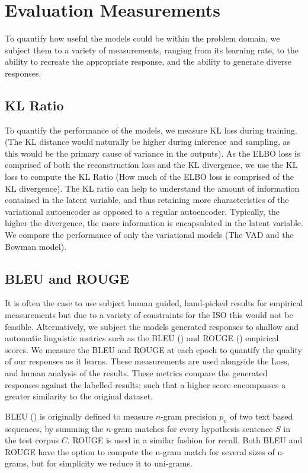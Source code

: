 \documentclass[12pt,twoside]{report}
\begin{document}
\section{Evaluation Measurements}

To quantify how useful the models could be within the problem domain, we subject them to a variety of measurements, ranging from its learning rate, to the ability to recreate the appropriate response, and the ability to generate diverse responses.

\subsection{KL Ratio}

To quantify the performance of the models, we measure KL loss during training. (The KL distance would naturally be higher during inference and sampling, as this would be the primary cause of variance in the outputs). As the ELBO loss is comprised of both the reconstruction loss and the KL divergence, we use the KL loss to compute the KL Ratio (How much of the ELBO loss is comprised of the KL divergence). The KL ratio can help to understand the amount of information contained in the latent variable, and thus retaining more characteristics of the variational autoencoder as opposed to a regular autoencoder.  Typically, the higher the divergence, the more information is encapsulated in the latent variable. We compare the performance of only the variational models (The VAD and the Bowman model).

\subsection{BLEU and ROUGE}

It is often the case to use subject human guided, hand-picked results for empirical measurements but due to a variety of constraints for the ISO this would not be feasible. Alternatively, we subject the models generated responses to shallow and automatic linguistic metrics such as the BLEU (\cite{papineni_bleu:_2001}) and ROUGE (\cite{lin_rouge:_2004}) empirical scores. We measure the BLEU and ROUGE at each epoch to quantify the quality of our responses as it learns. These measurements are used alongside the Loss, and human analysis of the results. These metrics compare the generated responses against the labelled results; such that a higher score encompasses a greater similarity to the original dataset.

BLEU (\cite{papineni_bleu:_2001}) is originally defined to measure $n$-gram precision $p_n$ of two text based sequences, by summing the $n$-gram matches for every hypothesis sentence $S$ in the test corpus $C$. ROUGE is used in a similar fashion for recall. Both BLEU and ROUGE have the option to compute the n-gram match for several sizes of n-grams, but for simplicity we reduce it to uni-grams.
\end{document}
